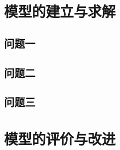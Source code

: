 %
%
%

\section{模型的建立与求解}

\subsection{问题一}

\subsection{问题二}

\subsection{问题三}

%
%
%

\section{模型的评价与改进}

